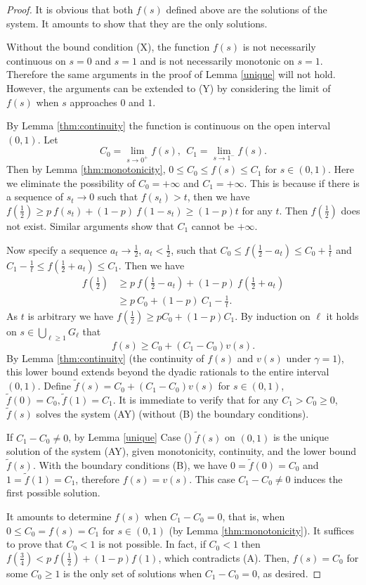 \documentclass{article}
\theoremstyle{named}
\begin{document}
\begin{proof}
It is obvious that both $f(s)$ defined above are the solutions of the system. It amounts to show that they are the only solutions. 


Without the bound condition ({X}), the function $f(s)$ is not necessarily continuous on $s=0$ and $s=1$ and is not necessarily monotonic on $s=1$. Therefore the same arguments in the proof of Lemma \ref{unique} will not hold. However, the arguments can be extended to ({Y}) by considering the limit of $f(s)$ when $s$ approaches $0$ and $1$.

By Lemma \ref{thm:continuity} the function is continuous on the open interval $(0,1)$. Let 
\begin{equation*}
C_0 = \lim_{s\rightarrow 0^+} f(s), \ \ C_1 = \lim_{s\rightarrow 1^-} f(s).
\end{equation*}
Then by Lemma \ref{thm:monotonicity}, $0\leq C_0\le f(s)\le C_1$ for $s\in (0,1)$. Here we eliminate the possibility of $C_0=+\infty$ and $C_1=+\infty$. This is because if there is a sequence of $s_t\rightarrow 0$ such that $f(s_t)>t$, then we have $f(\frac{1}{2})\geq p\ f(s_t)+(1-p)\ f(1-s_t)\geq (1-p)t$ for any $t$. Then $f(\frac{1}{2})$ does not exist. Similar arguments show that $C_1$ cannot be $+\infty$.

Now specify a sequence $a_t\rightarrow \frac{1}{2}$, $a_t<\frac{1}{2}$, such that $C_0\leq f(\frac{1}{2}-a_t) \leq C_0+\frac{1}{t}$ and $C_1-\frac{1}{t}\leq f(\frac{1}{2}+a_t) \leq C_1$. Then we have 
\begin{align*}
f(\frac{1}{2}) & \geq p\ f(\frac{1}{2}-a_t) + (1-p)\ f(\frac{1}{2}+a_t)\\
& \geq p\ C_0+(1-p)\ C_1 -\frac{1}{t}.
\end{align*}
As $t$ is arbitrary we have $f(\frac{1}{2})\geq pC_0+(1-p)C_1$. By induction on $\ell$ it holds on $s\in\bigcup_{\ell\geq 1} G_\ell$ that
\[
f(s) \geq C_0 + (C_1-C_0)v(s).
\]
By Lemma \ref{thm:continuity} (the continuity of $f(s)$ and $v(s)$ under $\gamma=1$), this lower bound extends beyond the dyadic rationals to the entire interval $(0,1)$. Define $\tilde f(s)=C_0 + (C_1-C_0)v(s)$ for $s\in (0,1)$, $\tilde f(0)=C_0, \tilde f(1)=C_1$. It is immediate to verify that for any $C_1>C_0\geq 0$, $\tilde f(s)$ solves the system ({AY}) (without ({B}) the boundary conditions). 

If $C_1-C_0\neq 0$, by Lemma \ref{unique} Case () $\tilde f(s)$ on $(0,1)$ is the unique solution of the system ({AY}), given monotonicity, continuity, and the lower bound $\tilde f(s)$. With the boundary conditions ({B}), we have $0=\tilde f(0)=C_0$ and $1=\tilde f(1)=C_1$, therefore $f(s)=v(s)$. This case $C_1-C_0\neq 0$ induces the first possible solution.

It amounts to determine $f(s)$ when $C_1-C_0=0$, that is, when $0\le C_0 = f(s)= C_1$ for $s\in (0,1)$ (by Lemma \ref{thm:monotonicity}). It suffices to prove that $C_0<1$ is not possible. In fact, if $C_0<1$ then $f(\frac{3}{4})<p\ f(\frac{1}{2}) + (1-p)f(1)$, which contradicts ({A}). Then, $f(s)=C_0$ for some $C_0\geq 1$ is the only set of solutions when $C_1-C_0=0$, as desired.
\end{proof}
\end{document}
